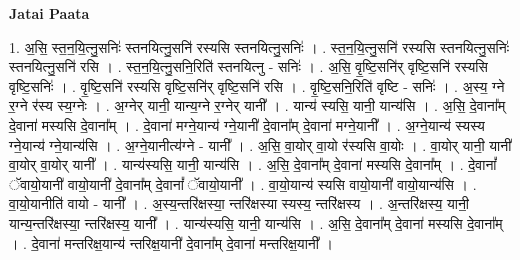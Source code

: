 \documentclass[17pt]{extarticle}
\begin{document}
\textbf{Jatai Paata} \newline

1. अ॒सि॒ स्त॒न॒यि॒त्नु॒सनिः॑ स्तनयित्नु॒सनि॑ रस्यसि स्तनयित्नु॒सनिः॑ । . स्त॒न॒यि॒त्नु॒सनि॑ रस्यसि स्तनयित्नु॒सनिः॑ स्तनयित्नु॒सनि॑ रसि । . स्त॒न॒यि॒त्नु॒सनि॒रिति॑ स्तनयित्नु - सनिः॑ । . अ॒सि॒ वृ॒ष्टि॒सनि॑र् वृष्टि॒सनि॑ रस्यसि वृष्टि॒सनिः॑ । . वृ॒ष्टि॒सनि॑ रस्यसि वृष्टि॒सनि॑र् वृष्टि॒सनि॑ रसि । . वृ॒ष्टि॒सनि॒रिति॑ वृष्टि - सनिः॑ । . अ॒स्य॒ ग्ने र॒ग्ने र॑स्य स्य॒ग्नेः । . अ॒ग्नेर् यानी॒ यान्य॒ग्ने र॒ग्नेर् यानी᳚ । . यान्य॑ स्यसि॒ यानी॒ यान्य॑सि । . अ॒सि॒ दे॒वाना᳚म् दे॒वाना॑ मस्यसि दे॒वाना᳚म् । . दे॒वाना॑ मग्ने॒यान्य॑ ग्ने॒यानी॑ दे॒वाना᳚म् दे॒वाना॑ मग्ने॒यानी᳚ । . अ॒ग्ने॒यान्य॑ स्यस्य ग्ने॒यान्य॑ ग्ने॒यान्य॑सि । . अ॒ग्ने॒यानीत्य॑ग्ने - यानी᳚ । . अ॒सि॒ वा॒योर् वा॒यो र॑स्यसि वा॒योः । . वा॒योर् यानी॒ यानी॑ वा॒योर् वा॒योर् यानी᳚ । . यान्य॑स्यसि॒ यानी॒ यान्य॑सि । . अ॒सि॒ दे॒वाना᳚म् दे॒वाना॑ मस्यसि दे॒वाना᳚म् । . दे॒वानां᳚ ॅवायो॒यानी॑ वायो॒यानी॑ दे॒वाना᳚म् दे॒वानां᳚ ॅवायो॒यानी᳚ । . वा॒यो॒यान्य॑ स्यसि वायो॒यानी॑ वायो॒यान्य॑सि । . वा॒यो॒यानीति॑ वायो - यानी᳚ । . अ॒स्य॒न्तरि॑क्षस्या॒ न्तरि॑क्षस्या स्यस्य॒ न्तरि॑क्षस्य । . अ॒न्तरि॑क्षस्य॒ यानी॒ यान्य॒न्तरि॑क्षस्या॒ न्तरि॑क्षस्य॒ यानी᳚ । . यान्य॑स्यसि॒ यानी॒ यान्य॑सि । . अ॒सि॒ दे॒वाना᳚म् दे॒वाना॑ मस्यसि दे॒वाना᳚म् । . दे॒वाना॑ मन्तरिक्ष॒यान्य॑ न्तरिक्ष॒यानी॑ दे॒वाना᳚म् दे॒वाना॑ मन्तरिक्ष॒यानी᳚ । \newline
\end{document}
